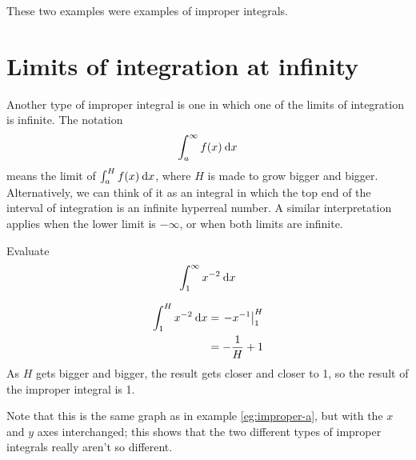 
These two examples were examples of improper integrals.

\section{Limits of integration at infinity}

Another type of improper integral is one in which one of the
limits of integration is infinite. The notation
\begin{equation*}
  \int_a^\infty f(x)\:\textup{d} x
\end{equation*}
means the limit of $\int_a^H f(x)\:\textup{d} x$, where $H$ is
made to grow bigger and bigger. Alternatively, we can
think of it as an integral in which the top end of the
interval of integration is an infinite hyperreal number.
A similar interpretation applies when the lower limit is
$-\infty$, or when both limits are infinite.

\begin{eg}
\egquestion Evaluate
\begin{equation*}
  \int_1^\infty x^{-2}\:\textup{d} x 
\end{equation*}

\eganswer
\begin{align*}
  \int_1^H x^{-2}\:\textup{d} x &= \left.-x^{-1}\right|_1^H \\
               &= -\frac{1}{H}+1
\end{align*}
As $H$ gets bigger and bigger, the result gets closer and closer
to 1, so the result of the improper integral is 1.

Note that this is the same graph as in example \ref{eg:improper-a}, but with the $x$ and $y$ axes
interchanged; this shows that the two different types of improper integrals really aren't so different.
\end{eg}


